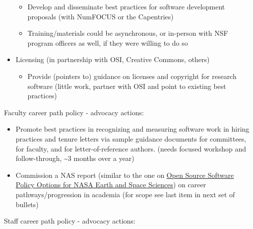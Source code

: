 \documentclass[
]{book}
\providecommand{\tightlist}{%
  \setlength{\itemsep}{0pt}\setlength{\parskip}{0pt}}
\begin{document}
\begin{itemize}
  \begin{itemize}
  \item
    Develop and disseminate best practices for software development proposals (with NumFOCUS or
    the Capentries)
  \item
    Training/materials could be asynchronous, or in-person with NSF program officers as well, if
    they were willing to do so
  \end{itemize}
\item
  Licensing (in partnership with OSI, Creative Commons, others)

  \begin{itemize}
  \tightlist
  \item
    Provide (pointers to) guidance on licenses and copyright for research software (little work,
    partner with OSI and point to existing best practices)
  \end{itemize}
\end{itemize}

Faculty career path policy - advocacy actions:

\begin{itemize}
\item
  Promote best practices in recognizing and measuring software work in hiring practices and
  tenure letters via sample guidance documents for committees, for faculty, and for
  letter-of-reference authors. (needs focused workshop and follow-through, \textasciitilde3 months over a year)
\item
  Commission a NAS report (similar to the one on \href{https://www.nap.edu/read/25217/chapter/1}{Open Source Software Policy Options for NASA
  Earth and Space Sciences}) on career pathways/progression
  in academia (for scope see last item in next set of bullets)
\end{itemize}

Staff career path policy - advocacy actions:
\end{document}
